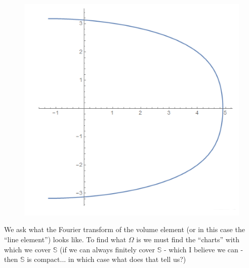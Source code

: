 \documentclass{article}
\theoremstyle{definition}
\begin{document}
\begin{figure}[!htb]
    \raisebox{1.5cm}{\noindent\Huge$\cup$}
    \includegraphics[scale=0.25]{eta-3.PNG}
\end{figure}

We ask what the Fourier transform of the volume element (or in this case the ``line element'') looks like. To find what $\Omega$ is we must find the ``charts'' with which we cover $\mathbb{S}$ (if we can always finitely cover $\mathbb{S}$ - which I believe we can - then $\mathbb{S}$ is compact... in which case what does that tell us?) \\
\end{document}
